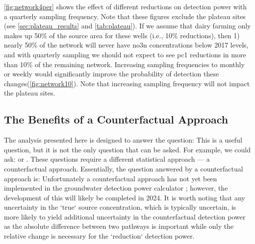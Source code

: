 \autoref{fig:network4per} shows the effect of different reductions on detection power with a quarterly sampling frequency. Note that these figures exclude the plateau sites (see \autoref{sec:plateau_results} and \autoref{tab:plateau}). If we assume that dairy farming only makes up 50\% of the source area for these wells (i.e., 10\% reductions), then 1) nearly 50\% of the network will never have \gls{no3n} concentrations below 2017 levels, and with quarterly sampling we should not expect to see \gls{pc1} reductions in more than 10\% of the remaining network. Increasing sampling frequencies to monthly or weekly would significantly improve the probability of detection these changes(\autoref{fig:network10}).  Note that increasing sampling frequency will not impact the plateau sites.

\subsection[Counterfactual Approach]{The Benefits of a Counterfactual Approach} \label{sec:counterfactual}

The analysis presented here is designed to answer the question:  This is a useful question, but it is not the only question that can be asked. For example, we could ask:
or
.
These questions require a different statistical approach --- a counterfactual approach. Essentially, the question answered by a counterfactual approach is:  Unfortunately a counterfactual approach has not yet been implemented in the groundwater detection power calculator \citep{dumont_komanawagw_detect_power_2023}; however, the development of this will likely be completed in 2024. It is worth noting that any uncertainty in the `true` source concentration, which is typically uncertain, is more likely to yield additional uncertainty in the counterfactual detection power as the absolute difference between two pathways is important while only the relative change is necessary for the `reduction` detection power.

